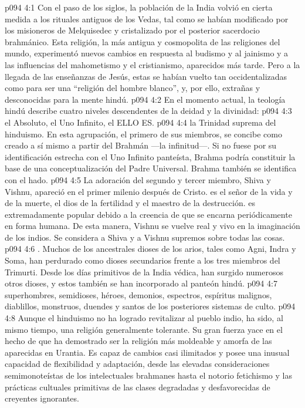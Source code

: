 \vs p094 4:1 Con el paso de los siglos, la población de la India volvió en cierta medida a los rituales antiguos de los Vedas, tal como se habían modificado por los misioneros de Melquisedec y cristalizado por el posterior sacerdocio brahmánico. Esta religión, la más antigua y cosmopolita de las religiones del mundo, experimentó nuevos cambios en respuesta al budismo y al jainismo y a las influencias del mahometismo y el cristianismo, aparecidos más tarde. Pero a la llegada de las enseñanzas de Jesús, estas se habían vuelto tan occidentalizadas como para ser una “religión del hombre blanco”, y, por ello, extrañas y desconocidas para la mente hindú.
\vs p094 4:2 \pc En el momento actual, la teología hindú describe cuatro niveles descendentes de la deidad y la divinidad:
\vs p094 4:3  el Absoluto, el Uno Infinito, el ELLO ES.
\vs p094 4:4  la Trinidad suprema del hinduismo. En esta agrupación,  el primero de sus miembros, se concibe como creado a sí mismo a partir del Brahmán ---la infinitud---. Si no fuese por su identificación estrecha con el Uno Infinito panteísta, Brahma podría constituir la base de una conceptualización del Padre Universal. Brahma también se identifica con el hado.
\vs p094 4:5 La adoración del segundo y tercer miembro, Shiva y Vishnu, apareció en el primer milenio después de Cristo.  es el señor de la vida y de la muerte, el dios de la fertilidad y el maestro de la destrucción.  es extremadamente popular debido a la creencia de que se encarna periódicamente en forma humana. De esta manera, Vishnu se vuelve real y vivo en la imaginación de los indios. Se considera a Shiva y a Vishnu supremos sobre todas las cosas.
\vs p094 4:6 . Muchos de los ancestrales dioses de los arios, tales como Agni, Indra y Soma, han perdurado como dioses secundarios frente a los tres miembros del Trimurti. Desde los días primitivos de la India védica, han surgido numerosos otros dioses, y estos también se han incorporado al panteón hindú.
\vs p094 4:7  superhombres, semidioses, héroes, demonios, espectros, espíritus malignos, diablillos, monstruos, duendes y santos de los posteriores sistemas de culto.
\vs p094 4:8 \pc Aunque el hinduismo no ha logrado revitalizar al pueblo indio, ha sido, al mismo tiempo, una religión generalmente tolerante. Su gran fuerza yace en el hecho de que ha demostrado ser la religión más moldeable y amorfa de las aparecidas en Urantia. Es capaz de cambios casi ilimitados y posee una inusual capacidad de flexibilidad y adaptación, desde las elevadas consideraciones semimonoteístas de los intelectuales brahmanes hasta el notorio fetichismo y las prácticas cultuales primitivas de las clases degradadas y desfavorecidas de creyentes ignorantes.
